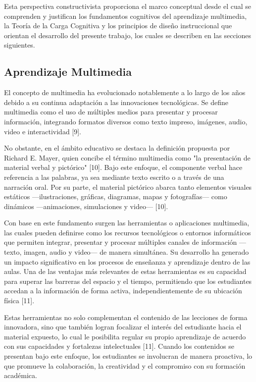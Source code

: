 \documentclass[11pt]{article}
\begin{document}
Esta perspectiva constructivista proporciona el marco conceptual desde el cual se comprenden y justifican los fundamentos cognitivos del aprendizaje multimedia, la Teoría de la Carga Cognitiva y los principios de diseño instruccional que orientan el desarrollo del presente trabajo, los cuales se describen en las secciones siguientes.



\subsection*{Aprendizaje Multimedia}
El concepto de multimedia ha evolucionado notablemente a lo largo de los años debido a su continua adaptación a las innovaciones tecnológicas. Se define multimedia como el uso de múltiples medios para presentar y procesar información, integrando formatos diversos como texto impreso, imágenes, audio, video e interactividad [9].

No obstante, en el ámbito educativo se destaca la definición propuesta por Richard E. Mayer, quien concibe el término multimedia como "la presentación de material verbal y pictórico" [10]. Bajo este enfoque, el componente verbal hace referencia a las palabras, ya sea mediante texto escrito o a través de una narración oral. Por su parte, el material pictórico abarca tanto elementos visuales estáticos —ilustraciones, gráficas, diagramas, mapas y fotografías— como dinámicos —animaciones, simulaciones y video— [10].

Con base en este fundamento surgen las herramientas o aplicaciones multimedia, las cuales pueden definirse como los recursos tecnológicos o entornos informáticos que permiten integrar, presentar y procesar múltiples canales de información —texto, imagen, audio y video— de manera simultánea. Su desarrollo ha generado un impacto significativo en los procesos de enseñanza y aprendizaje dentro de las aulas. Una de las ventajas más relevantes de estas herramientas es su capacidad para superar las barreras del espacio y el tiempo, permitiendo que los estudiantes accedan a la información de forma activa, independientemente de su ubicación física [11].

Estas herramientas no solo complementan el contenido de las lecciones de forma innovadora, sino que también logran focalizar el interés del estudiante hacia el material expuesto, lo cual le posibilita regular su propio aprendizaje de acuerdo con sus capacidades y fortalezas intelectuales [11]. Cuando los contenidos se presentan bajo este enfoque, los estudiantes se involucran de manera proactiva, lo que promueve la colaboración, la creatividad y el compromiso con su formación académica.
\end{document}
